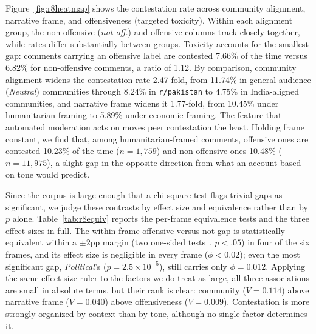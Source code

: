 Figure~\ref{fig:r8heatmap} shows the contestation rate across community alignment, narrative frame, and offensiveness (targeted toxicity). Within each alignment group, the non-offensive (\textit{not off.}) and offensive columns track closely together, while rates differ substantially between groups. Toxicity accounts for the smallest gap: comments carrying an offensive label are contested 7.66\% of the time versus 6.82\% for non-offensive comments, a ratio of 1.12. By comparison, community alignment widens the contestation rate 2.47-fold, from 11.74\% in general-audience (\textit{Neutral}) communities through 8.24\% in \texttt{r/pakistan} to 4.75\% in India-aligned communities, and narrative frame widens it 1.77-fold, from 10.45\% under humanitarian framing to 5.89\% under economic framing. The feature that automated moderation acts on moves peer contestation the least. Holding frame constant, we find that, among humanitarian-framed comments, offensive ones are contested 10.23\% of the time ($n = 1{,}759$) and non-offensive ones 10.48\% ($n = 11{,}975$), a slight gap in the opposite direction from what an account based on tone would predict.

Since the corpus is large enough that a chi-square test flags trivial gaps as significant, we judge these contrasts by effect size and equivalence rather than by $p$ alone. Table~\ref{tab:r8equiv} reports the per-frame equivalence tests and the three effect sizes in full. The within-frame offensive-versus-not gap is statistically equivalent within a $\pm 2$pp margin (two one-sided tests~\cite{lakens2017equivalence}, $p < .05$) in four of the six frames, and its effect size is negligible in every frame ($\phi < 0.02$); even the most significant gap, \textit{Political}'s ($p = 2.5\times10^{-5}$), still carries only $\phi = 0.012$. Applying the same effect-size ruler to the factors we do treat as large, all three associations are small in absolute terms, but their rank is clear: community ($V = 0.114$) above narrative frame ($V = 0.040$) above offensiveness ($V = 0.009$). Contestation is more strongly organized by context than by tone, although no single factor determines it. 

